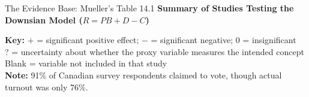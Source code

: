\documentclass[10pt]{beamer}
\begin{document}
\begin{frame}{The Evidence Base: Mueller's Table 14.1}
\textbf{Summary of Studies Testing the Downsian Model ($R = PB + D - C$)}




\footnotesize{
\textbf{Key:} $+$ = significant positive effect; $-$ = significant negative; $0$ = insignificant \\
\alert{? = uncertainty about whether the proxy variable measures the intended concept} \\
Blank = variable not included in that study \\
\textbf{Note:} 91\% of Canadian survey respondents claimed to vote, though actual turnout was only 76\%.
}
\end{frame}
\end{document}
